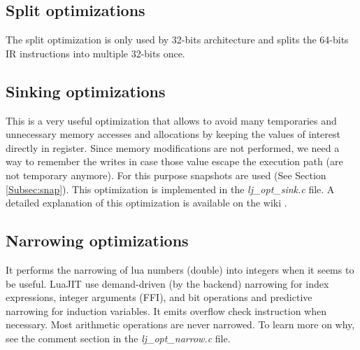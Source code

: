 
\subsection{Split optimizations}
\label{Subsec:opt-split}

The split optimization is only used by 32-bits architecture and splits the
64-bits IR instructions into multiple 32-bits once.


\subsection{Sinking optimizations}
\label{Subsec:opt-sinking}
This is a very useful optimization that allows to avoid many temporaries and
unnecessary memory accesses and allocations by keeping the values of interest
directly in register. Since memory modifications are not performed, we need a way
to remember the writes in case those value escape the execution path
(are not temporary anymore). For this purpose snapshots are used (See Section \ref{Subsec:snap}).
This optimization is implemented in the \emph{lj\_opt\_sink.c} file. A detailed
explanation of this optimization is available on the wiki \cite{luajit-sink}.


\subsection{Narrowing optimizations}
\label{Subsec:narrowing}

It performs the narrowing of lua numbers (double) into integers when it seems
to be useful. LuaJIT use demand-driven (by the backend) narrowing for index
expressions, integer arguments (FFI), and bit operations and predictive
narrowing for induction variables. It emits overflow check instruction when
necessary. Most arithmetic operations are never narrowed. To learn more on why,
see the comment section in the \emph{lj\_opt\_narrow.c} file.

